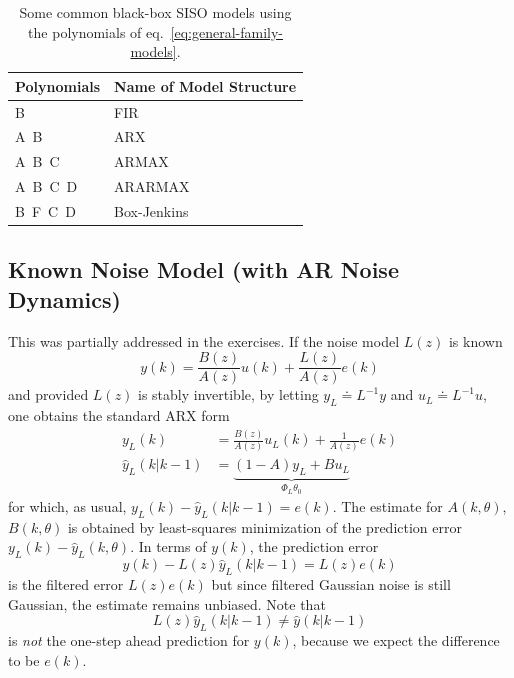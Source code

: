 \begin{table}[h]
  \centering
  \begin{tabular}[h]{ll}
    \toprule
    Polynomials & Name of Model Structure \\
    \midrule
    B & FIR \\
    A\ B & ARX \\
    A\ B\ C & ARMAX \\
    A\ B\ C\ D & ARARMAX \\
    B\ F\ C\ D & Box-Jenkins \\
    \bottomrule
  \end{tabular}
  \caption{Some common black-box SISO models using the polynomials of eq.~\eqref{eq:general-family-models}.}
  \label{tbl:black-box-models}
\end{table}

\subsection{Known Noise Model (with AR Noise Dynamics)}
\label{sec:known-noise-model}

This was partially addressed in the exercises. If the noise model $L(z)$ is known
\begin{equation*}
  y(k) = \frac{B(z)}{A(z)}u(k) + \frac{L(z)}{A(z)}e(k)
\end{equation*}
and provided $L(z)$ is stably invertible, by letting $y_L\doteq L^{-1}y$ and $u_L\doteq L^{-1}u$, one obtains the standard ARX form
\begin{align*}
  y_L(k) &= \frac{B(z)}{A(z)}u_L(k) + \frac{1}{A(z)}e(k) \\
\hat{y}_L(k|k-1) &= \underbrace{\left(1-A\right)y_L + Bu_L}_{\Phi_L\theta_0}
\end{align*}
for which, as usual, $y_L(k) - \hat{y}_L(k|k-1) = e(k)$. The estimate for $A(k,\theta)$, $B(k,\theta)$ is obtained by least-squares minimization of the prediction error $y_L(k) - \hat{y}_L(k,\theta)$. In terms of $y(k)$, the prediction error
\begin{equation*}
  y(k) - L(z)\hat{y}_L(k|k-1) = L(z)e(k)
\end{equation*}
is the filtered error $L(z)e(k)$ but since filtered Gaussian noise is still Gaussian, the estimate remains unbiased. Note that
\begin{equation*}
  L(z)\hat{y}_L(k|k-1) \neq \hat{y}(k|k-1)
\end{equation*}
is \emph{not} the one-step ahead prediction for $y(k)$, because we expect the difference to be $e(k)$.

